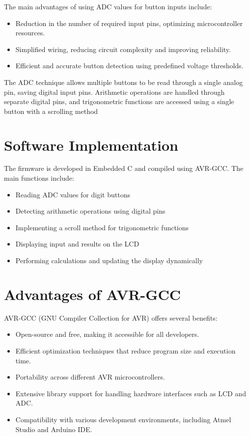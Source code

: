 \documentclass[journal]{IEEEtran}
\begin{document}
The main advantages of using ADC values for button inputs include:
\begin{itemize}
\item Reduction in the number of required input pins, optimizing microcontroller resources.
\item Simplified wiring, reducing circuit complexity and improving reliability.
\item Efficient and accurate button detection using predefined voltage thresholds.
\end{itemize}

The ADC technique allows multiple buttons to be read through a single analog pin, saving digital input pins. Arithmetic operations are handled through separate digital pins, and trigonometric functions are accessed using a single button with a scrolling method



\section{Software Implementation}
The firmware is developed in Embedded C and compiled using AVR-GCC. The main functions include:
\begin{itemize}
\item Reading ADC values for digit buttons
\item Detecting arithmetic operations using digital pins
\item Implementing a scroll method for trigonometric functions
\item Displaying input and results on the LCD
\item Performing calculations and updating the display dynamically
\end{itemize}

\section{Advantages of AVR-GCC}
AVR-GCC (GNU Compiler Collection for AVR) offers several benefits:
\begin{itemize}
\item Open-source and free, making it accessible for all developers.
\item Efficient optimization techniques that reduce program size and execution time.
\item Portability across different AVR microcontrollers.
\item Extensive library support for handling hardware interfaces such as LCD and ADC.
\item Compatibility with various development environments, including Atmel Studio and Arduino IDE.
\end{itemize}
\end{document}
